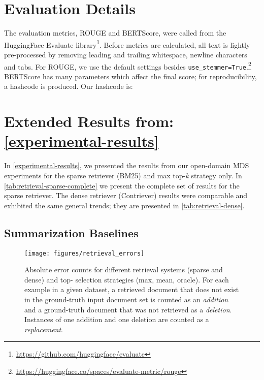 \documentclass[11pt]{article}
\begin{document}
\section{Evaluation Details}
\label{appendix:evaluation-details}

The evaluation metrics, ROUGE and BERTScore, were called from the HuggingFace Evaluate library\footnote{\url{https://github.com/huggingface/evaluate}}. Before metrics are calculated, all text is lightly pre-processed by removing leading and trailing whitespace, newline characters and tabs. For ROUGE, we use the default settings besides \texttt{use\_stemmer=True}.\footnote{\url{https://huggingface.co/spaces/evaluate-metric/rouge}} BERTScore has many parameters which affect the final score; for reproducibility, a hashcode is produced. Our hashcode is: 


\section{Extended Results from: \autoref{experimental-results}}
\label{appendix:experimental-results}

In \textsection \ref{experimental-results}, we presented the results from our open-domain MDS experiments for the sparse retriever (BM25) and max top-\textit{k} strategy only. In \autoref{tab:retrieval-sparse-complete} we present the complete set of results for the sparse retriever. The dense retriever (Contriever) results were comparable and exhibited the same general trends; they are presented in \autoref{tab:retrieval-dense}.

\subsection{Summarization Baselines}
\label{appendix:summarization-baselines}

\begin{figure*}[t]
\centering
\texttt{[image: figures/retrieval\_errors]}
\caption{Absolute error counts for different retrieval systems (sparse and dense) and top- selection strategies (max, mean, oracle). For each example in a given dataset, a retrieved document that does not exist in the ground-truth input document set is counted as an \textit{addition} and a ground-truth document that was not retrieved as a \textit{deletion}. Instances of one addition and one deletion are counted as a \textit{replacement}.}
\label{fig:retrieval-errors}
\end{figure*}
\end{document}
